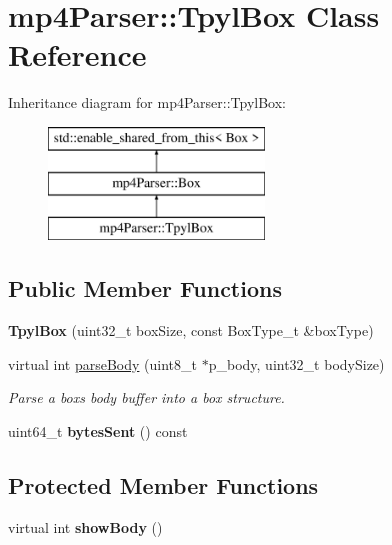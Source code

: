 \hypertarget{classmp4_parser_1_1_tpyl_box}{}\section{mp4\+Parser\+::Tpyl\+Box Class Reference}
\label{classmp4_parser_1_1_tpyl_box}
Inheritance diagram for mp4\+Parser\+::Tpyl\+Box\+:\begin{figure}[H]
\begin{center}
\leavevmode
\includegraphics[height=3.000000cm]{classmp4_parser_1_1_tpyl_box}
\end{center}
\end{figure}
\subsection*{Public Member Functions}
\begin{DoxyCompactItemize}
\item 
\mbox{\label{classmp4_parser_1_1_tpyl_box_ae10d67360e524135a17f0a38d648efc1}} 
{\bfseries Tpyl\+Box} (uint32\+\_\+t box\+Size, const Box\+Type\+\_\+t \&box\+Type)
\item 
virtual int \mbox{\hyperlink{classmp4_parser_1_1_tpyl_box_a957b9654a98d8bbaf39a41efc273d642}{parse\+Body}} (uint8\+\_\+t $\ast$p\+\_\+body, uint32\+\_\+t body\+Size)
\begin{DoxyCompactList}\small\item\em Parse a box\textquotesingle{}s body buffer into a box structure. \end{DoxyCompactList}\item 
\mbox{\label{classmp4_parser_1_1_tpyl_box_ae817250680c4d9a6091f3dc209e973ac}} 
uint64\+\_\+t {\bfseries bytes\+Sent} () const
\end{DoxyCompactItemize}
\subsection*{Protected Member Functions}
\begin{DoxyCompactItemize}
\item 
\mbox{\label{classmp4_parser_1_1_tpyl_box_a481114d9921d7b8e0e2220d75b296abe}} 
virtual int {\bfseries show\+Body} ()
\end{DoxyCompactItemize}
